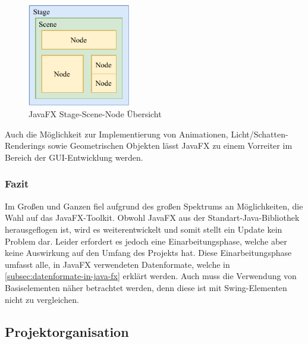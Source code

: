 \begin{figure}[H]
    \centering
    \includegraphics[width=0.4\textwidth]{fig/ainf/JavaFXStageSceneNode.pdf}
    \caption{JavaFX Stage-Scene-Node Übersicht}
    \label{fig:Stage-Scene-Node}
\end{figure}
Auch die Möglichkeit zur Implementierung von Animationen, Licht/Schatten-Renderings sowie Geometrischen Objekten lässt JavaFX zu einem Vorreiter im Bereich der GUI-Entwicklung werden.
\subsubsection{Fazit}
Im Großen und Ganzen fiel aufgrund des großen Spektrums an Möglichkeiten, die Wahl auf das JavaFX-Toolkit.
Obwohl JavaFX aus der Standart-Java-Bibliothek herausgeflogen ist, wird es weiterentwickelt und somit stellt ein Update kein Problem dar.
Leider erfordert es jedoch eine Einarbeitungsphase, welche aber keine Auswirkung auf den Umfang des Projekts hat.
Diese Einarbeitungsphase umfasst alle, in JavaFX verwendeten Datenformate, welche in \autoref{subsec:datenformate-in-java-fx} erklärt werden.
Auch muss die Verwendung von Basiselementen näher betrachtet werden, denn diese ist mit Swing-Elementen nicht zu vergleichen.
\subsection{Projektorganisation}\label{subsec:projektorganisation}
